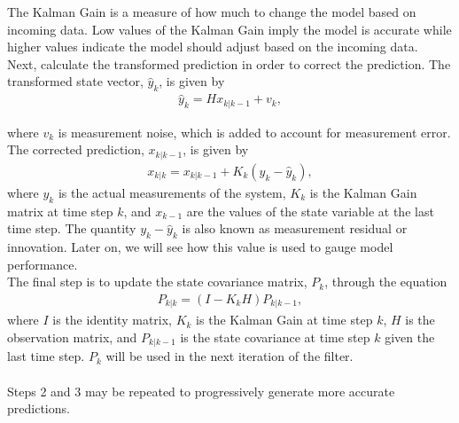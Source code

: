 \begin{enumerate}
     \noindent The Kalman Gain is a measure of how much to change the model based on incoming data. Low values of the Kalman Gain imply the model is accurate while higher values indicate the model should adjust based on the incoming data.  \\ 
   
     Next, calculate the transformed prediction in order to correct the prediction. The transformed state vector, $\hat y_k$, is given by
    \begin{align*}
        \hat y_k = H x_{k|k-1} + v_k,
    \end{align*}
    
    where $v_k$ is measurement noise, which is added to account for measurement error.
    The corrected prediction, $ x_{k|k-1} $, is given by
    \begin{align*} 
        x_{k|k} = x_{k|k - 1} + K_k(y_k - \hat y_{k}),
    \end{align*}
   where  $y_k$ is the actual measurements of the system, $K_k$ is the Kalman Gain matrix at time step $k$, and $x_{k-1}$ are the values of the state variable at the last time step. The quantity $y_k - \hat y_{k}$ is also known as measurement residual or innovation.  Later on, we will see how this value is used to gauge model performance. \\
   
      The final step is to update the state covariance matrix, $P_k $, through the equation
    \begin{align*} 
        P_{k|k} = (I - K_k H) P_{k | k-1},
    \end{align*}
    where $I$ is the identity matrix, $K_k$ is the Kalman Gain at time step $k$, $H$ is the observation matrix, and $P_{k|k-1}$ is the state covariance at time step $k$ given the last time step. $ P_k $ will be used in the next iteration of the filter. \\ \\
\noindent Steps 2 and 3 may be repeated to progressively generate more accurate predictions.
\end{enumerate} 


\newpage

